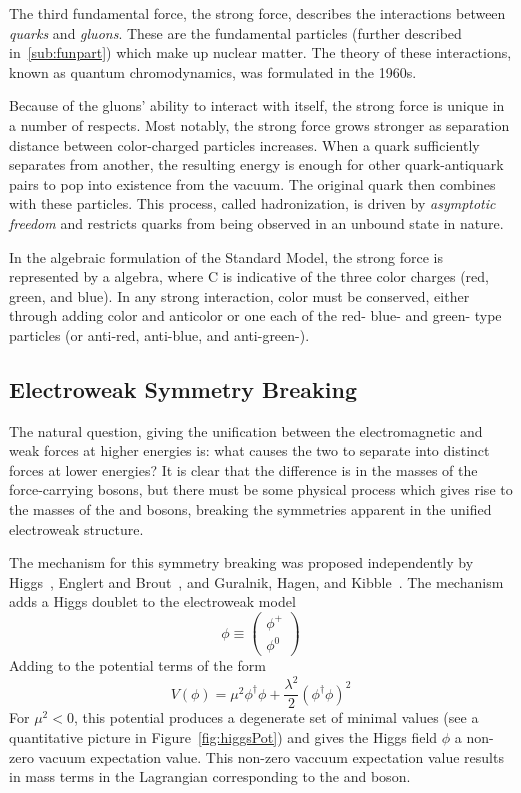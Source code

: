 The third fundamental force, the strong force, describes the interactions
between \emph{quarks} and \emph{gluons}. These are the fundamental particles
(further described in~\ref{sub:funpart}) which make up nuclear matter. The
theory of these interactions, known as quantum chromodynamics, was formulated
in the 1960s.

Because of the gluons' ability to interact with itself, the strong force is
unique in a number of respects. Most notably, the strong force grows stronger as
separation distance between color-charged particles increases. When a quark
sufficiently separates from another, the resulting energy is
enough for other quark-antiquark pairs to pop into existence from the vacuum.
The original quark then combines with these particles. This process, called
hadronization, is driven by \emph{asymptotic freedom} and restricts quarks from
being observed in an unbound state in nature. 

In the algebraic formulation of the Standard Model, the strong force
is represented by a \strong algebra, where C is indicative of the three color
charges (red, green, and blue). In any strong interaction, color must be
conserved, either through adding color and anticolor or one each of the red-
blue- and green- type particles (or anti-red, anti-blue, and anti-green-).

\subsection{Electroweak Symmetry Breaking}
The natural question, giving the unification between the electromagnetic and
weak forces at higher energies is: what causes the two to separate into distinct
forces at lower energies? It is clear that the difference is in the masses of
the force-carrying bosons, but there must be some physical process which gives
rise to the masses of the \W and \Z bosons, breaking the symmetries apparent in
the unified electroweak structure.

The mechanism for this symmetry breaking was proposed independently by
Higgs~\cite{PhysRevLett.13.508}, Englert and Brout~\cite{PhysRevLett.13.321}, and
Guralnik, Hagen, and Kibble~\cite{PhysRevLett.13.585}. The mechanism adds a Higgs
doublet to the electroweak model
\begin{equation*}
    \phi \equiv \left( \begin{array}{c} \phi^+ \\ \phi^0 \end{array} \right)
\end{equation*}
Adding to the potential terms of the form
\begin{equation*}
    V(\phi) = \mu^2\phi^\dagger\phi + \frac{\lambda^2}{2}(\phi^\dagger\phi)^2
\end{equation*}
For $\mu^2<0$, this potential produces a degenerate set of minimal values (see a
quantitative picture in Figure~\ref{fig:higgsPot}) and gives the Higgs field
$\phi$ a non-zero vacuum expectation value. This non-zero vaccuum expectation
value results in mass terms in the Lagrangian corresponding to the \W and \Z
boson.

